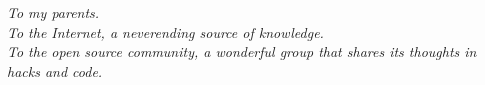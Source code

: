 \newpage
\vspace*{\fill}
\begin{center}
\textit{To my parents.\\
To the Internet, a neverending source of knowledge.\\
To the open source community, a wonderful group that shares its thoughts in hacks and code.}
\end{center}
\vspace*{\fill}
